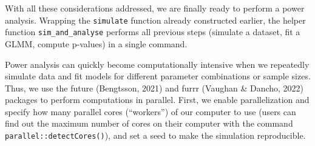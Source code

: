 \documentclass[
  man,floatsintext]{apa6}
\newenvironment{Shaded}{\begin{snugshade}}{\end{snugshade}}
\newcommand{\AttributeTok}[1]{\textcolor[rgb]{0.13,0.29,0.53}{#1}}
\newcommand{\CommentTok}[1]{\textcolor[rgb]{0.56,0.35,0.01}{\textit{#1}}}
\newcommand{\ControlFlowTok}[1]{\textcolor[rgb]{0.13,0.29,0.53}{\textbf{#1}}}
\newcommand{\DecValTok}[1]{\textcolor[rgb]{0.00,0.00,0.81}{#1}}
\newcommand{\FunctionTok}[1]{\textcolor[rgb]{0.13,0.29,0.53}{\textbf{#1}}}
\newcommand{\NormalTok}[1]{#1}
\newcommand{\OtherTok}[1]{\textcolor[rgb]{0.56,0.35,0.01}{#1}}
\newcommand{\SpecialCharTok}[1]{\textcolor[rgb]{0.81,0.36,0.00}{\textbf{#1}}}
\newcommand{\StringTok}[1]{\textcolor[rgb]{0.31,0.60,0.02}{#1}}
\begin{document}
With all these considerations addressed, we are finally ready to perform a power analysis. Wrapping the \texttt{simulate} function already constructed earlier, the helper function \texttt{sim\_and\_analyse} performs all previous steps (simulate a dataset, fit a GLMM, compute p-values) in a single command.

\begin{Shaded}
\end{Shaded}

Power analysis can quickly become computationally intensive when we repeatedly simulate data and fit models for different parameter combinations or sample sizes. Thus, we use the future (Bengtsson, 2021) and furrr (Vaughan \& Dancho, 2022) packages to perform computations in parallel. First, we enable parallelization and specify how many parallel cores (``workers'') of our computer to use (users can find out the maximum number of cores on their computer with the command \texttt{parallel::detectCores()}), and set a seed to make the simulation reproducible.
\end{document}
